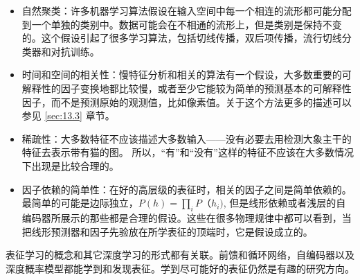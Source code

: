 \begin{itemize}
	\item 自然聚类：许多机器学习算法假设在输入空间中每一个相连的流形都可能分配到一个单独的类别中。数据可能会在不相通的流形上，但是类别是保持不变的。这个假设引起了很多学习算法，包括切线传播，双后项传播，流行切线分类器和对抗训练。

	\item 时间和空间的相关性：慢特征分析和相关的算法有一个假设，大多数重要的可解释性的因子变换地都比较慢，或者至少它能较为简单的预测基本的可解释性因子，而不是预测原始的观测值，比如像素值。关于这个方法更多的描述可以参见 \ref{sec:13.3} 章节。

	\item 稀疏性：大多数特征不应该描述大多数输入——没有必要去用检测大象主干的特征去表示带有猫的图。 所以，“有”和“没有”这样的特征不应该在大多数情况下出现是比较合理的。

	\item 因子依赖的简单性：在好的高层级的表征时，相关的因子之间是简单依赖的。最简单的可能是边际独立，$P(h) = \prod_{i} P（h_i)$,  但是线形依赖或者浅层的自编码器所展示的那些都是合理的假设。这些在很多物理规律中都可以看到，当把线形预测器和因子先验放在所学表征的顶端时，它是假设成立的。
\end{itemize}

表征学习的概念和其它深度学习的形式都有关联。前馈和循环网络，自编码器以及深度概率模型都能学到和发现表征。学到尽可能好的表征仍然是有趣的研究方向。
































